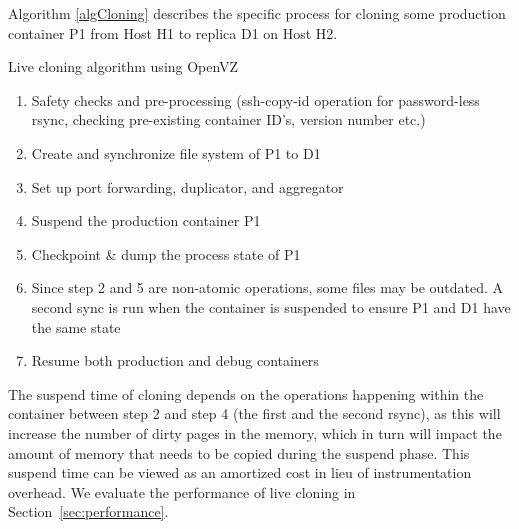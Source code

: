 Algorithm \ref{algCloning} describes the specific process for cloning some production container P1 from Host H1 to replica D1 on Host H2.


\begin{algorithm}[ht!]
  \caption{Live cloning algorithm using OpenVZ} 
  \label{algCloning}
  \begin{enumerate}[topsep=0pt,itemsep=-1ex,partopsep=1ex,parsep=1ex]
  \item Safety checks and pre-processing (ssh-copy-id operation for password-less rsync, checking pre-existing container ID's, version number etc.) 
  \item Create and synchronize file system of P1 to D1  
  \item Set up port forwarding, duplicator, and aggregator
  \item Suspend the production container P1
  \item Checkpoint \& dump the process state of P1
  \item Since step 2 and 5 are non-atomic operations, some files may be outdated.
A second sync is run when the container is suspended to ensure P1 and D1 have the same state
  \item Resume both production and debug containers
  \end{enumerate}
\end{algorithm}


The suspend time of cloning depends on the operations happening within the container between step 2 and step 4 (the first and the second rsync), as this will increase the number of dirty pages in the memory, which in turn will impact the amount of memory that needs to be copied during the suspend phase.
This suspend time can be viewed as an amortized cost in lieu of instrumentation overhead.
We evaluate the performance of live cloning in Section~\ref{sec:performance}.